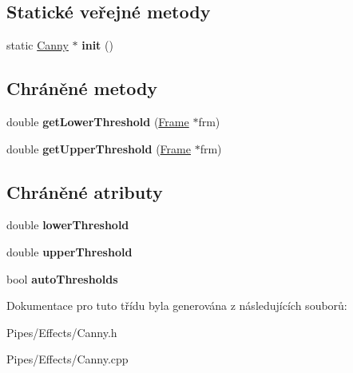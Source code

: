 \subsection*{Statické veřejné metody}
\begin{DoxyCompactItemize}
\item 
\hypertarget{class_ar_pipe_1_1_canny_a0666e7fa073b18c16701b454d6d4ab03}{static \hyperlink{class_ar_pipe_1_1_canny}{Canny} $\ast$ {\bfseries init} ()}\label{d0/d36/class_ar_pipe_1_1_canny_a0666e7fa073b18c16701b454d6d4ab03}

\end{DoxyCompactItemize}
\subsection*{Chráněné metody}
\begin{DoxyCompactItemize}
\item 
\hypertarget{class_ar_pipe_1_1_canny_add40d70a37dce319f756ce68785020e4}{double {\bfseries get\-Lower\-Threshold} (\hyperlink{class_ar_pipe_1_1_frame}{Frame} $\ast$frm)}\label{d0/d36/class_ar_pipe_1_1_canny_add40d70a37dce319f756ce68785020e4}

\item 
\hypertarget{class_ar_pipe_1_1_canny_a9407db425e6ece4b3ba98d97cb705c9f}{double {\bfseries get\-Upper\-Threshold} (\hyperlink{class_ar_pipe_1_1_frame}{Frame} $\ast$frm)}\label{d0/d36/class_ar_pipe_1_1_canny_a9407db425e6ece4b3ba98d97cb705c9f}

\end{DoxyCompactItemize}
\subsection*{Chráněné atributy}
\begin{DoxyCompactItemize}
\item 
\hypertarget{class_ar_pipe_1_1_canny_a0df1206380fdaa984cebb3c333f548e7}{double {\bfseries lower\-Threshold}}\label{d0/d36/class_ar_pipe_1_1_canny_a0df1206380fdaa984cebb3c333f548e7}

\item 
\hypertarget{class_ar_pipe_1_1_canny_ac48771787a479f0dcb7269161da61099}{double {\bfseries upper\-Threshold}}\label{d0/d36/class_ar_pipe_1_1_canny_ac48771787a479f0dcb7269161da61099}

\item 
\hypertarget{class_ar_pipe_1_1_canny_a6d9cf95bbc2428326afce4aadcb993d8}{bool {\bfseries auto\-Thresholds}}\label{d0/d36/class_ar_pipe_1_1_canny_a6d9cf95bbc2428326afce4aadcb993d8}

\end{DoxyCompactItemize}


Dokumentace pro tuto třídu byla generována z následujících souborů\-:\begin{DoxyCompactItemize}
\item 
Pipes/\-Effects/Canny.\-h\item 
Pipes/\-Effects/Canny.\-cpp\end{DoxyCompactItemize}
